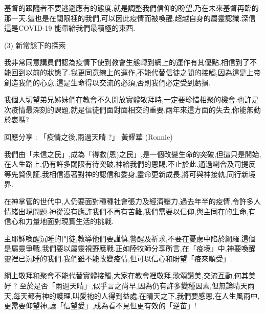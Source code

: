 \documentclass{book}
\begin{document}
基督的跟隨者不要逃避應有的態度,就是調整我們信仰的盼望,乃在未來基督再臨的那一天.這也是在閾限裡的我們,可以因此疫情而被喚醒,超越自身的屬靈認識.深信這是COVID-19 能帶給我們最積極的東西.

(3) 新常態下的探索

我非常同意講員們認為疫情下使到教會生態轉到網上的運作有其優點,相信到了不能回到以前的狀態了.我更同意線上的運作,不能代替信徒之間的接觸,因為這是上帝創造我們的心意.這是生命得以交流的必須,否則我們必定受到虧損.

我個人切望弟兄姊妹們在教會不久開放實體敬拜時,一定要珍惜相聚的機會.也許是次疫情最深刻的課題,就是信徒們面對面相交的重要.兩年來這方面的失去,你能無動於衷嗎?

回應分享 : 「疫情之後,雨過天晴 ?」  黃耀華 (Ronnie)

我們由「未信之民」,成為「得救(恩)之民」,是一個改變生命的突破,但這只是開始,在人生路上,仍有許多閾限有待突破,神給我們的恩賜,不止於此.通過喇合及司提反等先賢例証,我相信憑著對神的認信和委身,靈命更新成長,將可與神接軌,同行新境界.

在神掌管的世代中,人仍要面對種種社會張力及經濟壓力,過去年半的疫情,令許多人情緒出現問題.神從沒有應許我們不再有苦難,我們需要以信仰,與主同在的生命,有信心和力量地面對現實生活的挑戰.

主耶穌喚醒沉睡的門徒,教導他們要謹慎,警醒及祈求,不要在憂慮中陷於網羅.這個是屬靈爭戰,我們要以屬靈視野應戰.正如陸牧師分享所言,在「疫境」中,神要喚醒靈裡已沉睡的我們.我們雖不能改變疫情,但可以信心和盼望「疫來順受」.

網上敬拜和聚會不能代替實體接觸,大家在教會裡敬拜,歌頌讚美,交流互動,何其美好 ? 至於是否「雨過天晴」,似乎言之尚早,因為仍有許多變種因素,但無論晴天雨天,每天都有神的護理,叫愛衪的人得到益處.在晴天之下,我們要感恩,在人生風雨中,更需要仰望神,讓「信望愛」,成為看不見但更有效的「逆苗」!
\newpage
\end{document}
